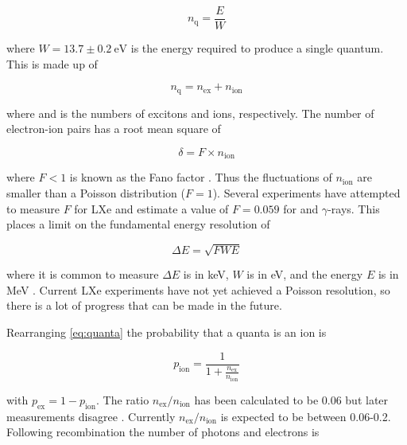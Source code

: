 \begin{equation}
n_{\mathrm{q}} = \frac{E}{W}
\label{eq:nquant_er}
\end{equation}

\noindent where $W = 13.7 \pm 0.2\ \mathrm{eV}$  is the energy required to produce a single quantum.  This is made up
of

\begin{equation}
n_{\mathrm{q}} = n_{\mathrm{ex}} + n_{\mathrm{ion}}
\label{eq:quanta}
\end{equation}

\noindent where \nex and \nion is the numbers of excitons and ions, respectively.  The number of electron-ion pairs has a root mean square
of

\begin{equation}
\delta = F \times n_{\mathrm{ion}}
\label{eq:fano}
\end{equation}

\noindent where $F < 1$ is known as the Fano factor .  Thus the fluctuations of $n_{\mathrm{ion}}$ are smaller than a
Poisson distribution ($F = 1$).  Several experiments have attempted to measure $F$ for LXe  and
estimate a value of $F = 0.059$ for \electron and $\gamma$-rays.  This places a limit on the fundamental energy resolution of

\begin{equation}
\Delta E = \sqrt{F W E}
\end{equation}

\noindent where it is common to measure $\Delta E$ is in keV, $W$ is in eV, and the energy $E$ is in MeV .  Current
LXe experiments have not yet achieved a Poisson resolution, so there is a lot of progress that can be made in the future.

Rearranging \eqref{eq:quanta} the probability that a quanta is an ion is

\begin{equation}
p_{\mathrm{ion}} = \frac{1}{1 + \frac{ n_{\mathrm{ex}} }{ n_{\mathrm{ion}} }}
\end{equation}

\noindent with $p_{\mathrm{ex}} = 1 - p_{\mathrm{ion}}$.  The ratio $n_{\mathrm{ex}} / n_{\mathrm{ion}}$ has been calculated to be
0.06 
but later measurements disagree .  Currently $n_{\mathrm{ex}} / n_{\mathrm{ion}}$ is expected to be
between 0.06-0.2.  Following recombination the number of photons and electrons is


